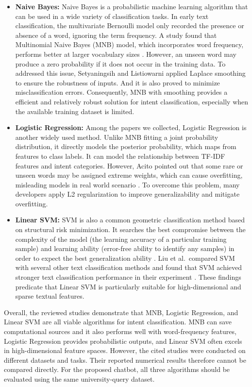 \documentclass[12pt,a4paper]{article}
\begin{document}
\begin{itemize}
    \item \textbf{Naive Bayes:} Naive Bayes is a probabilistic machine learning algorithm that can be used in a wide variety of classification tasks. In early text classification, the multivariate Bernoulli model only recorded the presence or absence of a word, ignoring the term frequency. A study found that Multinomial Naive Bayes (MNB) model, which incorporates word frequency, performs better at larger vocabulary sizes \cite{mccallum1998}. However, an unseen word may produce a zero probability if it does not occur in the training data. To addressed this issue, Setyaningsih and Listiowarni \cite{setyaningsih2021} applied Laplace smoothing to ensure the robustness of inputs. And it is also proved to minimize misclassification errors. Consequently, MNB with smoothing provides a efficient and relatively robust solution for intent classification, especially when the available training dataset is limited.

    \item \textbf{Logistic Regression:} Among the papers we collected, Logistic Regression is another widely used method. Unlike MNB fitting a joint probability distribution, it directly models the posterior probability, which maps from features to class labels. It can model the relationship between TF-IDF features and intent categories. However, Acito pointed out that some rare or unseen words may be assigned extreme weights, which can cause overfitting, misleading models in real world scenario \cite{acito2024}. To overcome this problem, many developers apply L2 regularization to improve generalizability and mitigate overfitting.

    \item \textbf{Linear SVM:} SVM is also a common geometric classification method based on structural risk minimization. It searches the best compromise between the complexity of the model (the learning accuracy of a particular training sample) and learning ability (error-free ability to identify any samples) in order to expect the best generalization ability \cite{li2009}. Liu et al.\ compared SVM with several other text classification methods and found that SVM achieved stronger text classification performance in their experiment \cite{liu2010}. These findings predicate that Linear SVM is particularly suitable for high-dimensional and sparse textual features.
\end{itemize}

Overall, the reviewed studies demonstrate that MNB, Logistic Regression, and Linear SVM are all viable algorithms for intent classification. MNB can save computational sources and it also performs well with word-frequency features, Logistic Regression provides probabilistic outputs, and Linear SVM often excels in high-dimensional feature spaces. However, the cited studies were conducted on different datasets and tasks. Their reported numerical results therefore cannot be compared directly. For the proposed chatbot, all three algorithms should be evaluated using the same university-query dataset.
\end{document}
